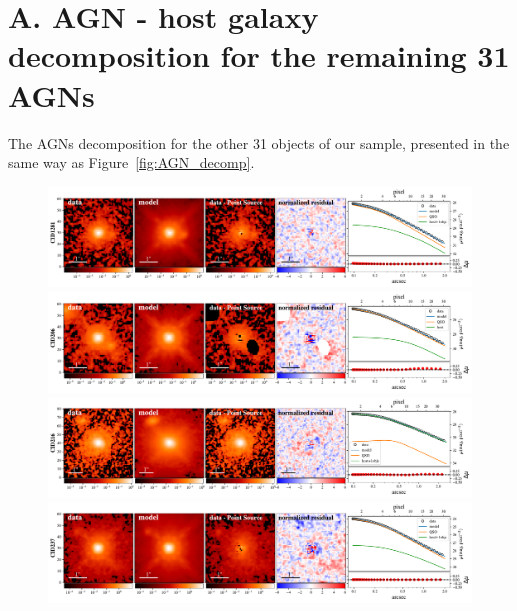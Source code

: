 \documentclass[apj]{emulateapj}
\begin{document}
\newpage

\appendix

\section{A. AGN - host galaxy decomposition for the remaining 31 AGNs}\label{sec:restsample}
The AGNs decomposition for the other 31 objects of our sample, presented in the same way as Figure~\ref{fig:AGN_decomp}.

\begin{figure}[ht]
\centering
{
\includegraphics[height=0.25\textwidth]{fig/best_fit_CID1281_SB_profile.pdf}
\includegraphics[height=0.25\textwidth]{fig/best_fit_CID206_SB_profile.pdf}
\includegraphics[height=0.25\textwidth]{fig/best_fit_CID216_SB_profile.pdf}
\includegraphics[height=0.25\textwidth]{fig/best_fit_CID237_SB_profile.pdf}
}
\end{figure} 
\end{document}
